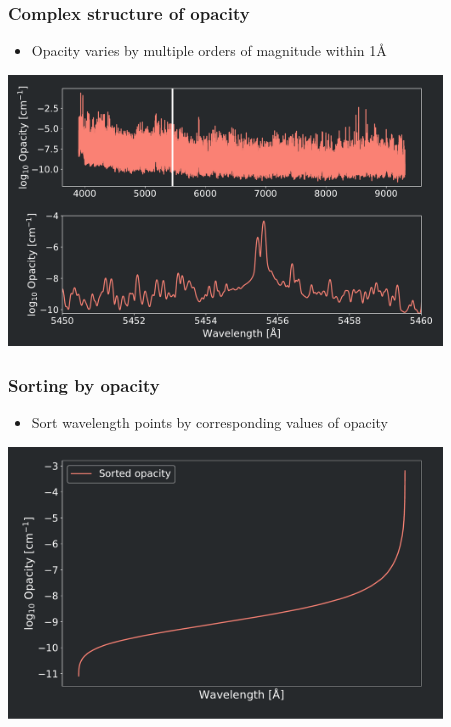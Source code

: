 {
	\frametitle{Complex structure of opacity}
	\begin{itemize}
		\item Opacity varies by multiple orders of magnitude within 1\si{\angstrom}
	\end{itemize}
	\centering
	\includegraphics[width=115mm]{images/spectra_transmitted_and_opacity_1}
}

\frame
{
	\frametitle{Sorting by opacity}
	\begin{itemize}
		\item Sort wavelength points by corresponding values of opacity
	\end{itemize}
    \centering
	\includegraphics[width=115mm]{images/sorted_opacity_and_sub_bins_0}
}

